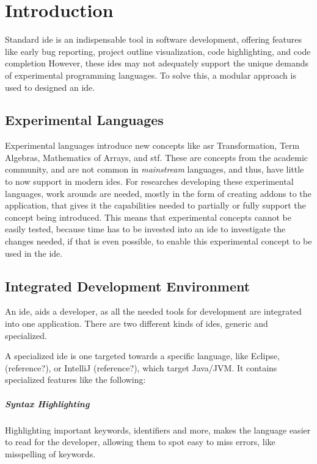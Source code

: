 \chapter{Introduction}

Standard \gls{ide} is an indispensable tool in software development, offering
features like early bug reporting, project outline visualization, code
highlighting, and code completion However, these \gls{ide}s may not adequately
support the unique demands of experimental programming languages. To solve this,
a modular approach is used to designed an \gls{ide}.

\section{Experimental Languages}

Experimental languages introduce new concepts like \gls{asr} Transformation,
Term Algebras, Mathematics of Arrays, and \gls{stf}. These are concepts from the
academic community, and are not common in \textit{mainstream} languages, and
thus, have little to now support in modern \gls{ide}s. For researches developing
these experimental languages, work arounds are needed, mostly in the form of
creating addons to the application, that gives it the capabilities needed to
partially or fully support the concept being introduced. This means that
experimental concepts cannot be easily tested, because time has to be
invested into an \gls{ide} to investigate the changes needed, if that is
even possible, to enable this experimental concept to be used in the \gls{ide}.


\section{Integrated Development Environment}

An \gls{ide}, aids a developer, as all the needed tools for development are
integrated into one application. There are two different kinds of \gls{ide}s,
generic and specialized. 

A specialized \gls{ide} is one targeted towards a specific language, like
Eclipse, (reference?), or IntelliJ (reference?), which target Java/JVM. It
contains specialized features like the following:


\paragraph{Syntax Highlighting} Highlighting important keywords, identifiers
and more, makes the language easier to read for the developer, allowing them to
spot easy to miss errors, like misspelling of keywords.

